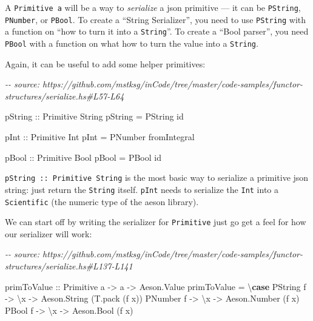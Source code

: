 \documentclass[]{article}
\newenvironment{Shaded}{}{}
\newcommand{\CommentTok}[1]{\textcolor[rgb]{0.38,0.63,0.69}{\textit{#1}}}
\newcommand{\DataTypeTok}[1]{\textcolor[rgb]{0.56,0.13,0.00}{#1}}
\newcommand{\FunctionTok}[1]{\textcolor[rgb]{0.02,0.16,0.49}{#1}}
\newcommand{\KeywordTok}[1]{\textcolor[rgb]{0.00,0.44,0.13}{\textbf{#1}}}
\newcommand{\NormalTok}[1]{#1}
\newcommand{\OtherTok}[1]{\textcolor[rgb]{0.00,0.44,0.13}{#1}}
\begin{document}
A \texttt{Primitive\ a} will be a way to \emph{serialize} a json primitive ---
it can be \texttt{PString}, \texttt{PNumber}, or \texttt{PBool}. To create a
``String Serializer'', you need to use \texttt{PString} with a function on ``how
to turn it into a \texttt{String}''. To create a ``Bool parser'', you need
\texttt{PBool} with a function on what how to turn the value into a
\texttt{String}.

Again, it can be useful to add some helper primitives:

\begin{Shaded}
\begin{Highlighting}[]
\CommentTok{{-}{-} source: https://github.com/mstksg/inCode/tree/master/code{-}samples/functor{-}structures/serialize.hs\#L57{-}L64}

\OtherTok{pString ::} \DataTypeTok{Primitive} \DataTypeTok{String}
\NormalTok{pString }\OtherTok{=} \DataTypeTok{PString} \FunctionTok{id}

\OtherTok{pInt ::} \DataTypeTok{Primitive} \DataTypeTok{Int}
\NormalTok{pInt }\OtherTok{=} \DataTypeTok{PNumber} \FunctionTok{fromIntegral}

\OtherTok{pBool ::} \DataTypeTok{Primitive} \DataTypeTok{Bool}
\NormalTok{pBool }\OtherTok{=} \DataTypeTok{PBool} \FunctionTok{id}
\end{Highlighting}
\end{Shaded}

\texttt{pString\ ::\ Primitive\ String} is the most basic way to serialize a
primitive json string: just return the \texttt{String} itself. \texttt{pInt}
needs to serialize the \texttt{Int} into a \texttt{Scientific} (the numeric type
of the aeson library).

We can start off by writing the serializer for \texttt{Primitive} just go get a
feel for how our serializer will work:

\begin{Shaded}
\begin{Highlighting}[]
\CommentTok{{-}{-} source: https://github.com/mstksg/inCode/tree/master/code{-}samples/functor{-}structures/serialize.hs\#L137{-}L141}

\OtherTok{primToValue ::} \DataTypeTok{Primitive}\NormalTok{ a }\OtherTok{{-}>}\NormalTok{ a }\OtherTok{{-}>} \DataTypeTok{Aeson.Value}
\NormalTok{primToValue }\OtherTok{=}\NormalTok{ \textbackslash{}}\KeywordTok{case}
  \DataTypeTok{PString}\NormalTok{ f }\OtherTok{{-}>}\NormalTok{ \textbackslash{}x }\OtherTok{{-}>} \DataTypeTok{Aeson.String}\NormalTok{ (T.pack (f x))}
  \DataTypeTok{PNumber}\NormalTok{ f }\OtherTok{{-}>}\NormalTok{ \textbackslash{}x }\OtherTok{{-}>} \DataTypeTok{Aeson.Number}\NormalTok{ (f x)}
  \DataTypeTok{PBool}\NormalTok{   f }\OtherTok{{-}>}\NormalTok{ \textbackslash{}x }\OtherTok{{-}>} \DataTypeTok{Aeson.Bool}\NormalTok{   (f x)}
\end{Highlighting}
\end{Shaded}
\end{document}
